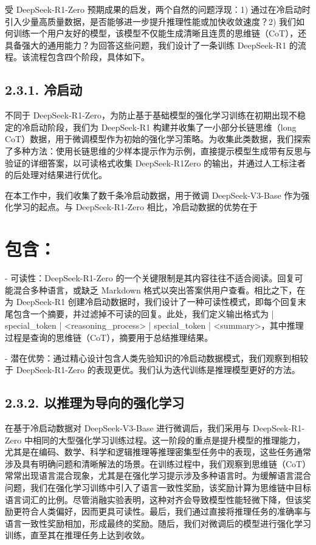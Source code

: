 \documentclass[12pt,a4paper]{report} %
\begin{document}
受 DeepSeek-R1-Zero 预期成果的启发，两个自然的问题浮现：1) 通过在冷启动时引入少量高质量数据，是否能够进一步提升推理性能或加快收敛速度？2) 我们如何训练一个用户友好的模型，该模型不仅能生成清晰且连贯的思维链（CoT），还具备强大的通用能力？为回答这些问题，我们设计了一条训练 DeepSeek-R1 的流程。该流程包含四个阶段，具体如下。


\subsection*{2.3.1. 冷启动}


不同于 DeepSeek-R1-Zero，为防止基于基础模型的强化学习训练在初期出现不稳定的冷启动阶段，我们为 DeepSeek-R1 构建并收集了一小部分长链思维（long CoT）数据，用于微调模型作为初始的强化学习策略。为收集此类数据，我们探索了多种方法：使用长链思维的少样本提示作为示例，直接提示模型生成带有反思与验证的详细答案，以可读格式收集 DeepSeek-R1Zero 的输出，并通过人工标注者的后处理对结果进行优化。


在本工作中，我们收集了数千条冷启动数据，用于微调 DeepSeek-V3-Base 作为强化学习的起点。与 DeepSeek-R1-Zero 相比，冷启动数据的优势在于
\section*{包含：}


- 可读性：DeepSeek-R1-Zero 的一个关键限制是其内容往往不适合阅读。回复可能混合多种语言，或缺乏 Markdown 格式以突出答案供用户查看。相比之下，在为 DeepSeek-R1 创建冷启动数据时，我们设计了一种可读性模式，即每个回复末尾包含一个摘要，并过滤掉不可读的回复。此处，我们定义输出格式为 | special\_token | \textless{}reasoning\_process\textgreater{} | special\_token | \textless{}summary\textgreater{}，其中推理过程是查询的思维链（CoT），摘要用于总结推理结果。


- 潜在优势：通过精心设计包含人类先验知识的冷启动数据模式，我们观察到相较于 DeepSeek-R1-Zero 的表现更优。我们认为迭代训练是推理模型更好的方法。


\subsection*{2.3.2. 以推理为导向的强化学习}


在基于冷启动数据对 DeepSeek-V3-Base 进行微调后，我们采用与 DeepSeek-R1-Zero 中相同的大型强化学习训练过程。这一阶段的重点是提升模型的推理能力，尤其是在编码、数学、科学和逻辑推理等推理密集型任务中的表现，这些任务通常涉及具有明确问题和清晰解法的场景。在训练过程中，我们观察到思维链（CoT）常常出现语言混合现象，尤其是在强化学习提示涉及多种语言时。为缓解语言混合问题，我们在强化学习训练中引入了语言一致性奖励，该奖励计算为思维链中目标语言词汇的比例。尽管消融实验表明，这种对齐会导致模型性能轻微下降，但该奖励更符合人类偏好，因而更具可读性。最后，我们通过直接将推理任务的准确率与语言一致性奖励相加，形成最终的奖励。随后，我们对微调后的模型进行强化学习训练，直至其在推理任务上达到收敛。
\end{document}
